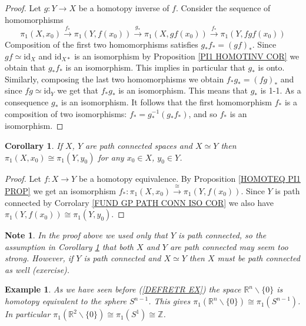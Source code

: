 \documentclass[11pt, letterpaper, oneside]{report}
\theoremstyle{pplain}
\newtheorem{corollary}[theorem]{Corollary}
\theoremstyle{ddefinition}
\newtheorem{example}[theorem]{Example}
\newtheorem{note}[theorem]{Note}
\theoremstyle{nnn}
\theoremstyle{eexercise}
\newcommand{\lra}{\longrightarrow}
\newcommand{\Z}{{\mathbb Z}}
\newcommand{\R}{{\mathbb R}}
\newcommand{\id}{\mathrm{id}}
\newcommand{\ssmin}{\smallsetminus}
\begin{document}
\begin{proof}
Let $g\colon Y \to X$ be a homotopy inverse of $f$. Consider the sequence of homomorphisms 
$$\pi_{1}(X, x_{0}) \overset{f_{\ast}}{\lra} \pi_{1}(Y, f(x_{0})) 
\overset{g_{\ast}}{\lra} \pi_{1}(X, gf(x_{0}))
\overset{f_{\ast}}{\lra} \pi_{1}(Y, fgf(x_{0})) $$
Composition of the first two homomorphisms satisfies $g_{\ast}f_{\ast} = (gf)_{\ast}$. Since 
$gf\simeq \id_{X}$ and $\id_{X\ast}$ is an isomorphism by Proposition \ref{PI1 HOMOTINV COR}
we obtain that $g_{\ast}f_{\ast}$ is an isomorphism. This implies in particular that $g_{\ast}$ is onto. 
Similarly, composing the last two homomorphisms we obtain $f_{\ast}g_{\ast} = (fg)_{\ast}$
and since $fg\simeq \id_{Y}$ we get that $f_{\ast}g_{\ast}$ is an isomorphism. This means
that $g_{\ast}$ is 1-1. As a consequence $g_{\ast}$ is an isomorphism. It follows that the first 
homomorphism $f_{\ast}$ is a composition of two isomorphisms: $f_{\ast} = g_{\ast}^{-1}(g_{\ast}f_{\ast})$, 
and so $f_{\ast}$ is an isomorphism. 


\end{proof}

\begin{corollary}
\label{PATHCON HOMOTEQ PI1 ISO COR}
If $X$, $Y$ are path connected spaces and $X \simeq Y$ then $\pi_{1}(X, x_{0}) \cong \pi_{1}(Y, y_{0})$
for any $x_{0}\in X$, $y_{0}\in Y$. 
\end{corollary}

\begin{proof}
Let $f\colon X\to Y$ be a homotopy equivalence. By Proposition \ref{HOMOTEQ PI1 PROP}
we get an isomorphism $f_{\ast}\colon \pi_{1}(X, x_{0}) \overset{\cong}{\lra} \pi_{1}(Y, f(x_{0}))$.  
Since $Y$ is path connected by Corrolary \ref{FUND GP PATH CONN ISO COR} we also have 
$\pi_{1}(Y, f(x_{0})) \cong \pi_{1}(Y, y_{0})$. 
\end{proof}

\begin{note}
In the proof above we  used only that $Y$ is path connected, so the assumption in 
Corollary \ref{PATHCON HOMOTEQ PI1 ISO COR} that both $X$ and $Y$ are path connected 
may seem too strong. However, if $Y$ is path connected and $X\simeq Y$ then $X$ must be 
path connected as well (exercise). 
\end{note}

\begin{example} As we have seen before (\ref{DEFRETR EX}) the space  $\R^{n}\ssmin \{0\}$
is homotopy equivalent to the sphere $S^{n-1}$. This gives
$\pi_{1}(\R^{n}\ssmin \{0\}) \cong \pi_{1}(S^{n-1})$. In particular 
$\pi_{1}(\R^{2}\ssmin\{0\}) \cong \pi_{1}(S^{1})\cong \Z$. 
\end{example}
\end{document}
